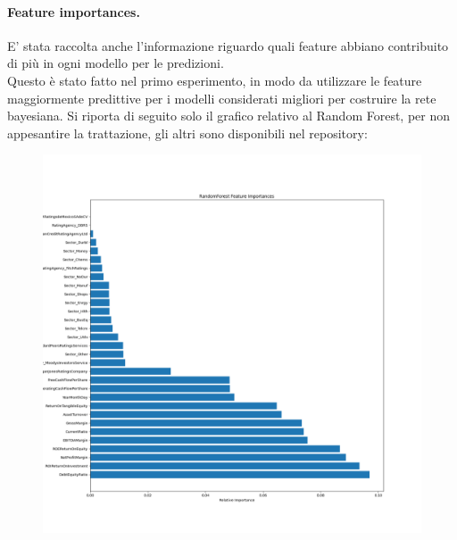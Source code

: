 \paragraph{Feature importances.} E' stata raccolta anche l'informazione riguardo quali feature abbiano contribuito di più in ogni modello per le predizioni.
\\Questo è stato fatto nel primo esperimento, in modo da utilizzare le feature maggiormente predittive per i modelli considerati migliori per costruire la rete bayesiana. Si riporta di seguito solo il grafico relativo al Random Forest, per non appesantire la trattazione, gli altri sono disponibili nel repository:

\begin{figure}[H]
    \centering
    \includegraphics[scale=0.35]{img/feature_importances_RandomForest.png}
\end{figure}



